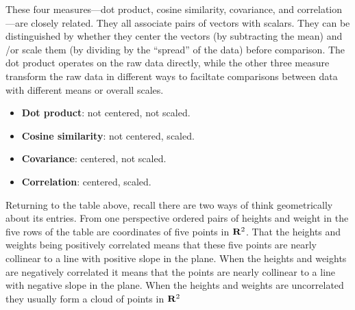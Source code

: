 
   These four measures—dot product, cosine similarity, covariance, and 
correlation—are closely related.  They all associate pairs of vectors with 
scalars.  They can be distinguished by whether they center the vectors (by 
subtracting the mean) and /or scale them (by dividing by the 
``spread'' of the data) before comparison.  The dot product operates on the raw
data directly, while the other three measure transform the raw data in 
different ways to faciltate comparisons between data with different means or 
overall scales.

\begin{itemize}
    \item \textbf{Dot product}: not centered, not scaled.
    \item \textbf{Cosine similarity}: not centered, scaled.
    \item \textbf{Covariance}: centered, not scaled.
    \item \textbf{Correlation}: centered, scaled.
\end{itemize}

Returning to the table above, recall there are two ways of think geometrically about its entries. From one perspective  ordered pairs of heights and weight in the five rows of  the table are coordinates of five points in ${\bf R}^2$.
That the heights and weights being positively correlated means that these five 
points are nearly collinear to a line with positive slope in the plane.  When 
the heights and weights are negatively correlated it means that the points are 
nearly collinear to a line with negative slope in the plane.  When the heights 
and weights are uncorrelated they usually form a cloud of points in ${\bf R}^2$ 
\label{twogeoms}

